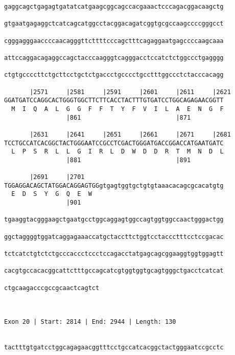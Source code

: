 \documentclass{article}
\begin{document}
\begin{Verbatim}
gaggcagctgagagtgatatcatgaagcggcagccacgaaactcccagacggacaagctg
                                                            
gtgaatgagaggctcatcagcatggcctacggacagatcggtgcgccaagccccgggcct
                                                            
cgggagggaaccccaacagggttcttttcccagctttcagaggaatgagccccaagcaaa
                                                            
attccaggacagaggccagctacccaagggtcagggacctccatctctggccctgagggg
                                                            
ctgtgccccttctgcttcctgctctgaccctgcccctgcctttggccctctacccacagg
                                                            
       |2571     |2581     |2591     |2601     |2611     |2621
GGATGATCCAGGCACTGGGTGGCTTCTTCACCTACTTTGTGATCCTGGCAGAGAACGGTT
  M  I  Q  A  L  G  G  F  F  T  Y  F  V  I  L  A  E  N  G  F
                 |861                          |871         
  
       |2631     |2641     |2651     |2661     |2671     |2681
TCCTGCCATCACGGCTACTGGGAATCCGCCTCGACTGGGATGACCGGACCATGAATGATC
  L  P  S  R  L  L  G  I  R  L  D  W  D  D  R  T  M  N  D  L
                 |881                          |891         
  
       |2691     |2701                                      
TGGAGGACAGCTATGGACAGGAGTGGgtgagtggtgctgtgtaaacacagcgcacatgtg
  E  D  S  Y  G  Q  E  W                                    
                 |901                                       
  
tgaaggtacgggaagctgaatgcctggcaggagtggccagtggtggccaactgggactgg
                                                            
ggctaggggtggatcaggagaaaccatgctaccttctggtcctaccctttcctccgacac
                                                            
tctcatctgtctctgcccaccctccctccagacctatgagcagcggaaggtggtggagtt
                                                            
cacgtgccacacggcattctttgccagcatcgtggtggtgcagtgggctgacctcatcat
                                                            
ctgcaagacccgccgcaactcagtct
                          
                          
 
Exon 20 | Start: 2814 | End: 2944 | Length: 130


tactttgtgatcctggcagagaacggtttcctgccatcacggctactgggaatccgcctc
                                                            

\end{Verbatim}
\end{document}
